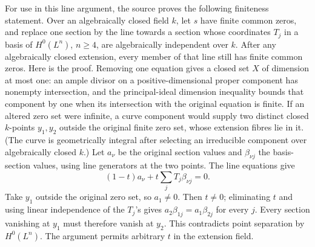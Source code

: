 For use in this line argument, the source proves the following
finiteness statement.  Over an algebraically closed field \(k\),
let \(s\) have finite common zeros, and replace one section by the
line towards a section whose coordinates \(T_j\) in a basis of
\(H^0(L^n)\), \(n\geq4\), are algebraically independent over \(k\).
After any algebraically closed extension, every member of that
line still has finite common zeros.
Here is the proof.  Removing one equation gives a closed set \(X\)
of dimension at most one: an ample divisor on a positive-dimensional
proper component has nonempty intersection, and the principal-ideal
dimension inequality bounds that component by one when its
intersection with the original equation is finite.
If an altered zero set were infinite, a curve component would
supply two distinct closed \(k\)-points \(y_1,y_2\) outside the
original finite zero set, whose extension fibres lie in it.
(The curve is geometrically integral after selecting an irreducible
component over algebraically closed \(k\).)
Let \(a_\nu\) be the original section values and
\(\beta_{\nu j}\) the basis-section values, using line generators
at the two points.  The line equations give
\[
 (1-t)a_\nu+t\sum_jT_j\beta_{\nu j}=0 .
\]
Take \(y_1\) outside the original zero set, so \(a_1\ne0\).
Then \(t\ne0\); eliminating \(t\) and using linear independence
of the \(T_j\)'s gives
\(a_2\beta_{1j}=a_1\beta_{2j}\) for every \(j\).
Every section vanishing at \(y_1\) must therefore vanish at \(y_2\).
This contradicts point separation by \(H^0(L^n)\).
The argument permits arbitrary \(t\) in the extension field.

